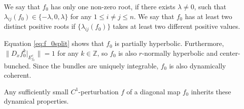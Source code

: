 \documentclass[11pt]{amsart}
\numberwithin{equation}{section}
\newcommand{\Z}{\mathbb{Z}}
\theoremstyle{plain}
\begin{document}
We say that $f_0$ has only one non-zero root, if there exists $\lambda\neq 0$, such that $\lambda_{ij}(f_0)\in \{-\lambda,0,\lambda\}$ for any $1\le i\neq j\le n$. We say that $f_0$ has at least two distinct positive roots if $\{\lambda_{ij}(f_0)\}$ takes at least two different positive values.

Equation \ref{eq:f_0split} shows that $f_0$ is partially hyperbolic. Furthermore, $\|D_xf_0^k|_{E^c_{f_0}}\|=1$ for any $k\in \Z$, so $f_0$ is also $r$-normally hyperbolic and center-bunched. Since the bundles are uniquely integrable, $f_0$ is also dynamically coherent.



Any sufficiently small $C^1$-perturbation $f$ of a diagonal map $f_0$ inherits these dynamical properties.
\end{document}
